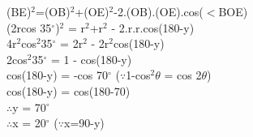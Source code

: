 \documentclass[journal,12pt,twocolumn]{IEEEtran}
\renewcommand\thesection{\arabic{section}}
\begin{document}
\begin{enumerate}[label=\thesection.\arabic*.,ref=\thesection.\theenumi]
               (BE)$^{2}$=(OB)$^{2}$+(OE)$^{2}$-2.(OB).(OE).cos($<$BOE)\\ 
                (2rcos 35$^{\circ}$)$^{2}$ = r$^{2}$+r$^{2}$ - 2.r.r.cos(180-y)\\ 
                4r$^{2}$cos$^{2}$35$^{\circ}$ = 2r$^{2}$ - 2r$^{2}$cos(180-y)\\ 
                2cos$^{2}$35$^{\circ}$ = 1 - cos(180-y)\\ 
                cos(180-y) = -cos 70$^{\circ}$       (${\because}$1-cos$^{2}$${\theta}$ = cos 2${\theta}$)\\ 
                cos(180-y) = cos(180-70)\\ 
                ${\therefore}$y = 70$^{\circ}$\\ 
               ${\therefore}$x = 20$^{\circ}$             (${\because}$x=90-y)\\  
               
               
\end{enumerate}
\end{document}
